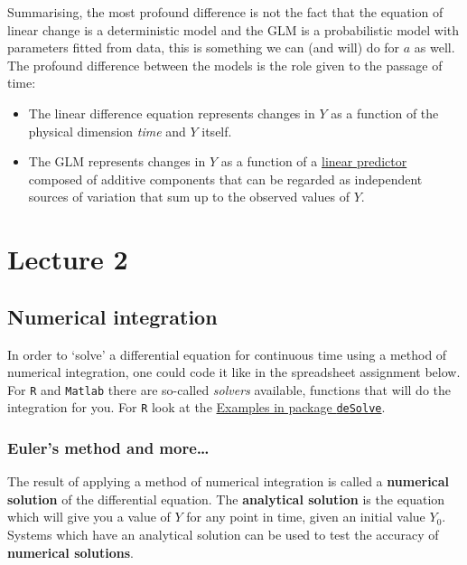 \documentclass[]{book}
\providecommand{\tightlist}{%
  \setlength{\itemsep}{0pt}\setlength{\parskip}{0pt}}
\let\stdsection\section
\renewcommand\section{\newpage\stdsection}
\begin{document}
Summarising, the most profound difference is not the fact that the
equation of linear change is a deterministic model and the GLM is a
probabilistic model with parameters fitted from data, this is something
we can (and will) do for \(a\) as well. The profound difference between
the models is the role given to the passage of time:

\begin{itemize}
\tightlist
\item
  The linear difference equation represents changes in \(Y\) as a
  function of the physical dimension \emph{time} and \(Y\) itself.
\item
  The GLM represents changes in \(Y\) as a function of a
  \href{https://en.wikipedia.org/wiki/Linear_predictor_function}{linear
  predictor} composed of additive components that can be regarded as
  independent sources of variation that sum up to the observed values of
  \(Y\).
\end{itemize}

\chapter*{Lecture 2}\label{lecture-2}

\section*{Numerical integration}\label{numerical-integration}

In order to `solve' a differential equation for continuous time using a
method of numerical integration, one could code it like in the
spreadsheet assignment below. For \texttt{R} and \texttt{Matlab} there
are so-called \emph{solvers} available, functions that will do the
integration for you. For \texttt{R} look at the
\href{http://desolve.r-forge.r-project.org}{Examples in package
\texttt{deSolve}}.

\subsection*{Euler's method and
more\ldots{}}\label{eulers-method-and-more}

The result of applying a method of numerical integration is called a
\textbf{numerical solution} of the differential equation. The
\textbf{analytical solution} is the equation which will give you a value
of \(Y\) for any point in time, given an initial value \(Y_0\). Systems
which have an analytical solution can be used to test the accuracy of
\textbf{numerical solutions}.
\end{document}
